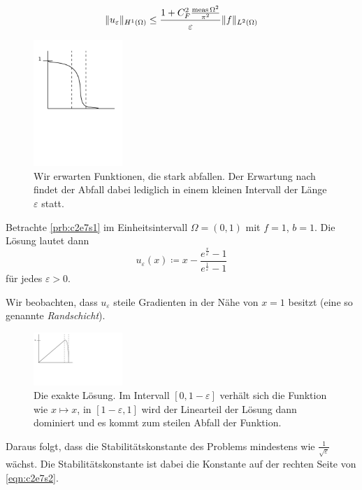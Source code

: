 \documentclass[../skript.tex]{subfiles}
\begin{document}
\begin{equation}\label{eqn:c2e7s2}
	\| u_\varepsilon\|_{H^1(\Omega)} \leq \frac{1+C_F^2\frac{\operatorname{meas}{\Omega}^2}{\pi^2}}{\varepsilon}\|f\|_{L^2(\Omega)}
\end{equation}
\begin{figure}[ht]
	\centering
	\includegraphics[width=0.3\textwidth]{Images/5-12-heuristik.pdf}
	\caption{Wir erwarten Funktionen, die stark abfallen. Der Erwartung nach findet der Abfall dabei lediglich in einem kleinen Intervall der Länge $\varepsilon$ statt.}
	\label{figure_heuristik}
\end{figure}
\begin{example}\label{ex:c2e7s1}
	Betrachte \cref{prb:c2e7s1} im Einheitsintervall $\Omega=(0,1)$ mit $f=1$, $b=1$. Die Lösung lautet dann
	\[
		u_\varepsilon(x)\coloneqq x-\frac{e^{\frac{x}{\varepsilon}}-1}{e^{\frac{1}{\varepsilon}}-1}
	\]
	für jedes $\varepsilon > 0$.\par
	Wir beobachten, dass $u_\varepsilon$ steile Gradienten in der Nähe von $x=1$ besitzt (eine so genannte \emph{Randschicht}).
	\begin{figure}[ht]
	\centering
		\includegraphics[width=0.3\textwidth]{Images/5-12-ergebnis.pdf}
		\caption{Die exakte Lösung. Im Intervall $[0,1-\varepsilon]$ verhält sich die Funktion wie $x\mapsto x$, in $[1-\varepsilon,1]$ wird der Linearteil der Lösung dann dominiert und es kommt zum steilen Abfall der Funktion.}
		\label{figure_loesung}
	\end{figure}
	Daraus folgt, dass die Stabilitätskonstante des Problems mindestens wie $\frac{1}{\sqrt{\varepsilon}}$ wächst. Die Stabilitätskonstante ist dabei die Konstante auf der rechten Seite von \cref{eqn:c2e7s2}.
\end{example}
\end{document}
